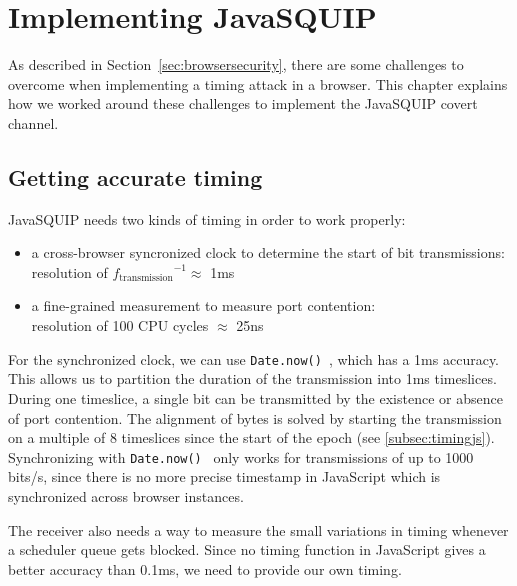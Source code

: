 \documentclass[11pt,
  titlepage=false,
]{scrreprt}
\begin{document}
\chapter{Implementing JavaSQUIP}
\label{ch:implementation}
As described in Section~\ref{sec:browsersecurity}, there are some challenges to overcome when implementing a timing attack in a browser.
This chapter explains how we worked around these challenges to implement the JavaSQUIP covert channel.

\section{Getting accurate timing}
\label{sec:accurate-timing}
JavaSQUIP needs two kinds of timing in order to work properly:
\begin{itemize}
    \item a cross-browser syncronized clock to determine the start of bit transmissions:\\
    resolution of ${f_{\text{transmission}}}^{-1} \approx$ 1ms
    \item a fine-grained measurement to measure port contention:\\
    resolution of 100 CPU cycles $\approx$ 25ns
\end{itemize}

For the synchronized clock, we can use \texttt{Date.now()}~\cite{datenow}, which has a 1ms accuracy.
This allows us to partition the duration of the transmission into 1ms timeslices.
During one timeslice, a single bit can be transmitted by the existence or absence of port contention.
The alignment of bytes is solved by starting the transmission on a multiple of 8 timeslices since the start of the epoch (see \ref{subsec:timingjs}).
Synchronizing with \texttt{Date.now()}~\cite{datenow} only works for transmissions of up to 1000 bits/s,
since there is no more precise timestamp in JavaScript which is synchronized across browser instances.


The receiver also needs a way to measure the small variations in timing whenever a scheduler queue gets blocked.
Since no timing function in JavaScript gives a better accuracy than 0.1ms, we need to provide our own timing.
\end{document}
